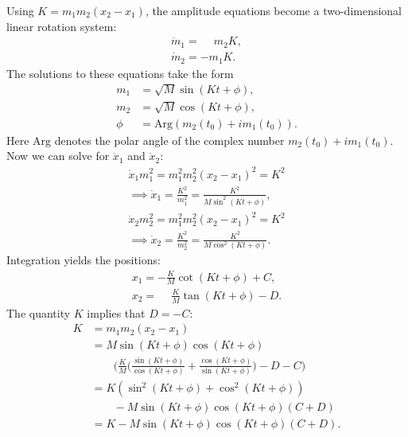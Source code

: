 \documentclass[english,master]{liumaiex}
\theoremstyle{thesisplain}
\theoremstyle{thesisdefinition}
\numberwithin{equation}{section}
\begin{document}
%
Using $K=m_1m_2(x_2-x_1)$, the amplitude equations become a two-dimensional linear rotation system:
\begin{equation}
\begin{aligned}
	\dot{m}_1 = \phantom{-}m_2K, \\
	\dot{m}_2 = -m_1K.
\end{aligned}
\end{equation}
%
The solutions to these equations take the form
\begin{equation}
\begin{aligned}
	m_1 &= \sqrt{M} \sin(Kt + \phi), \\
	m_2 &= \sqrt{M} \cos(Kt + \phi), \\
    \phi &= \text{Arg}(m_2(t_0) + i m_1(t_0)).
\end{aligned}
\end{equation}
Here $\text{Arg}$ denotes the polar angle of the complex number $m_2(t_0)+im_1(t_0)$.
%
Now we can solve for $\dot{x}_1$ and $\dot{x}_2$:
\begin{align}
	\dot{x}_1m_1^2 = m_1^2m_2^2(x_2 - x_1)^2 = K^2 \\
	\implies
	\dot{x}_1 = \frac{K^2}{m_1^2} = \frac{K^2}{M\sin^2(Kt + \phi)}, \\
	\dot{x}_2m_2^2 = m_1^2m_2^2(x_2 - x_1)^2 = K^2 \\
	\implies
	\dot{x}_2 = \frac{K^2}{m_2^2} = \frac{K^2}{M\cos^2(Kt + \phi)}.
\end{align}
%
Integration yields the positions:
\begin{equation}
\begin{aligned}
	x_1 = -\frac{K}{M}\cot(Kt + \phi) + C,\\
	x_2 = \phantom{-}\frac{K}{M}\tan(Kt + \phi) - D.
\end{aligned}
\end{equation}
%
The quantity $K$ implies that $D = -C$:
\begin{equation}
\begin{aligned}
	K &= m_1m_2(x_2 - x_1) \\
	&= M \sin(Kt + \phi) \cos(Kt + \phi) \\
	& \qquad \Big( \frac{K}{M} \Big(\frac{\sin(Kt + \phi)}{\cos(Kt + \phi)} +
	\frac{\cos(Kt + \phi)}{\sin(Kt + \phi)}\Big) - D - C \Big) \\
	&= K(\sin^2(Kt + \phi) + \cos^2(Kt + \phi)) \\
	& \qquad - M \sin(Kt + \phi) \cos(Kt + \phi)(C + D) \\
	&= K - M \sin(Kt + \phi) \cos(Kt + \phi)(C + D).
\end{aligned}
\end{equation}
\end{document}
